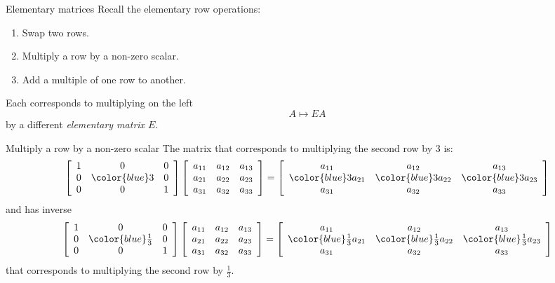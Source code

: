 \documentclass{beamer}
\begin{document}
\begin{frame}{Elementary matrices}
  Recall the elementary row operations:\vfill
  \begin{enumerate}
  \item Swap two rows.
  \item Multiply a row by a non-zero scalar.
  \item Add a multiple of one row to another.
  \end{enumerate}\vfill
  Each corresponds to multiplying on the left\vfill
  \begin{equation*}
    A \mapsto EA
  \end{equation*}\vfill
  by a different \emph{elementary matrix $E$}.
\end{frame}

\begin{frame}{Multiply a row by a non-zero scalar}
  The matrix that corresponds to multiplying the second row by $3$ is:\vfill
  \begin{equation*}
    \left[
      \begin{array}{ccc}
        1&0&0\\
        0&{\color{blue}3}&0\\
        0&0&1
      \end{array}
    \right]
    \left[
      \begin{array}{ccc}
        a_{11}&a_{12}&a_{13}\\
        a_{21}&a_{22}&a_{23}\\
        a_{31}&a_{32}&a_{33}
      \end{array}
    \right]=
    \left[
      \begin{array}{ccc}
        a_{11}&a_{12}&a_{13}\\
        {\color{blue}3}a_{21}&{\color{blue}3}a_{22}&{\color{blue}3}a_{23}\\
        a_{31}&a_{32}&a_{33}
      \end{array}
    \right]
  \end{equation*}\vfill
  and has inverse\vfill
   \begin{equation*}
    \left[
      \begin{array}{ccc}
        1&0&0\\
        0&{\color{blue}\frac{1}{3}}&0\\
        0&0&1
      \end{array}
    \right]
    \left[
      \begin{array}{ccc}
        a_{11}&a_{12}&a_{13}\\
        a_{21}&a_{22}&a_{23}\\
        a_{31}&a_{32}&a_{33}
      \end{array}
    \right]=
    \left[
      \begin{array}{ccc}
        a_{11}&a_{12}&a_{13}\\
        {\color{blue}\frac{1}{3}}a_{21}&{\color{blue}\frac{1}{3}}a_{22}&{\color{blue}\frac{1}{3}}a_{23}\\
        a_{31}&a_{32}&a_{33}
      \end{array}
    \right]
  \end{equation*}\vfill
  that corresponds to multiplying the second row by $\frac{1}{3}$.
\end{frame}
\end{document}
